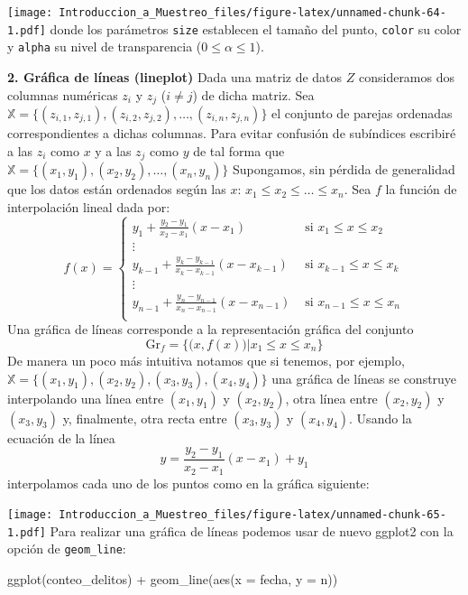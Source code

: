 \documentclass[
]{book}
\newenvironment{Shaded}{\begin{snugshade}}{\end{snugshade}}
\newcommand{\AttributeTok}[1]{\textcolor[rgb]{0.77,0.63,0.00}{#1}}
\newcommand{\FunctionTok}[1]{\textcolor[rgb]{0.00,0.00,0.00}{#1}}
\newcommand{\NormalTok}[1]{#1}
\newcommand{\SpecialCharTok}[1]{\textcolor[rgb]{0.00,0.00,0.00}{#1}}
\begin{document}
\texttt{[image: Introduccion\_a\_Muestreo\_files/figure-latex/unnamed-chunk-64-1.pdf]}
donde los parámetros \texttt{size} establecen el tamaño del punto, \texttt{color} su color y \texttt{alpha} su nivel de transparencia (\(0 \leq \alpha \leq 1\)).

\textbf{2. Gráfica de líneas (lineplot)} Dada una matriz de datos \(Z\) consideramos dos columnas numéricas \(z_i\) y \(z_j\) (\(i \neq j\)) de dicha matriz. Sea \(\mathbb{X} = \{ (z_{i,1}, z_{j,1}), (z_{i,2}, z_{j,2}), \dots, (z_{i,n}, z_{j,n}) \}\) el conjunto de parejas ordenadas correspondientes a dichas columnas. Para evitar confusión de subíndices escribiré a las \(z_i\) como \(x\) y a las \(z_j\) como \(y\) de tal forma que \(\mathbb{X} = \{ (x_1, y_1), (x_2, y_2), \dots, (x_n, y_n) \}\)
Supongamos, sin pérdida de generalidad que los datos están ordenados según las \(x\): \(x_1 \leq x_2 \leq \dots \leq x_n\). Sea \(f\) la función de interpolación lineal dada por:
\[
f(x) = \begin{cases}
y_1 + \frac{y_2 - y_1}{x_2 - x_1} (x -x_1) & \text{ si } x_1 \leq x \leq x_2 \\
\vdots \\
y_{k-1} + \frac{y_k - y_{k-1}}{x_k - x_{k-1}} (x -x_{k-1}) & \text{ si } x_{k-1} \leq x \leq x_k \\
\vdots \\
y_{n-1} + \frac{y_{n} - y_{n-1}}{x_n - x_{n-1}} (x -x_{n-1}) & \text{ si } x_{n-1} \leq x \leq x_n \\
\end{cases}
\]
Una gráfica de líneas corresponde a la representación gráfica del conjunto
\[
\textrm{Gr}_f = \Big\{ \big(x, f(x)\big) |  x_1 \leq x \leq x_n \Big\}
\]
De manera un poco más intuitiva notamos que si tenemos, por ejemplo, \(\mathbb{X} = \{(x_1, y_1),(x_2, y_2), (x_3, y_3), (x_4, y_4)\}\) una gráfica de líneas se construye interpolando una línea entre \((x_1, y_1)\) y \((x_2, y_2)\), otra línea entre \((x_2, y_2)\) y \((x_3, y_3)\) y, finalmente, otra recta entre \((x_3, y_3)\) y \((x_4, y_4)\). Usando la ecuación de la línea
\[
y = \frac{y_2 - y_1}{x_2 - x_1} (x - x_1) + y_1
\]
interpolamos cada uno de los puntos como en la gráfica siguiente:

\texttt{[image: Introduccion\_a\_Muestreo\_files/figure-latex/unnamed-chunk-65-1.pdf]}
Para realizar una gráfica de líneas podemos usar de nuevo ggplot2 con la opción de \texttt{geom\_line}:

\begin{Shaded}
\begin{Highlighting}[]
\FunctionTok{ggplot}\NormalTok{(conteo\_delitos) }\SpecialCharTok{+} 
  \FunctionTok{geom\_line}\NormalTok{(}\FunctionTok{aes}\NormalTok{(}\AttributeTok{x =}\NormalTok{ fecha, }\AttributeTok{y =}\NormalTok{ n))}
\end{Highlighting}
\end{Shaded}
\end{document}
